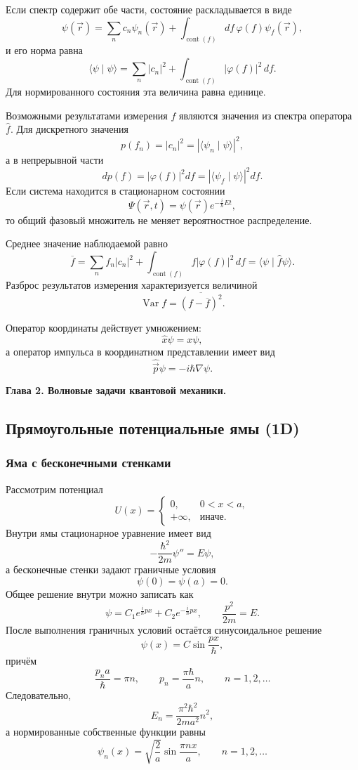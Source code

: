\documentclass[12pt,a4paper]{article}
\begin{document}
Если спектр содержит обе части, состояние раскладывается в виде
\[
    \psi(\vec r)=\sum_n c_n\psi_n(\vec r)
    +\int_{\operatorname{cont}(f)}df\,\varphi(f)\psi_f(\vec r),
\]
и его норма равна
\[
    \langle\psi\mid\psi\rangle
    =\sum_n|c_n|^2
    +\int_{\operatorname{cont}(f)}|\varphi(f)|^2\,df.
\]
Для нормированного состояния эта величина равна единице.

Возможными результатами измерения $f$ являются значения из спектра
оператора $\hat f$. Для дискретного значения
\[
    p(f_n)=|c_n|^2=|\langle\psi_n\mid\psi\rangle|^2,
\]
а в непрерывной части
\[
    dp(f)=|\varphi(f)|^2df
    =|\langle\psi_f\mid\psi\rangle|^2df.
\]
Если система находится в стационарном состоянии
\[
    \Psi(\vec r,t)=\psi(\vec r)e^{-\frac{i}{\hbar}Et},
\]
то общий фазовый множитель не меняет вероятностное распределение.

Среднее значение наблюдаемой равно
\[
    \overline f
    =\sum_n f_n|c_n|^2
    +\int_{\operatorname{cont}(f)}f|\varphi(f)|^2\,df
    =\boxed{\langle\psi\mid\hat f\psi\rangle}.
\]
Разброс результатов измерения характеризуется величиной
\[
    \operatorname{Var}f
    =\overline{(f-\overline f)^2}.
\]

Оператор координаты действует умножением:
\[
    \hat x\psi=x\psi,
\]
а оператор импульса в координатном представлении имеет вид
\[
    \hat{\vec p}\psi=-i\hbar\nabla\psi.
\]

\medskip
\noindent\textbf{Глава 2. Волновые задачи квантовой механики.}

\subsection{Прямоугольные потенциальные ямы (1D)}

\subsubsection{Яма с бесконечными стенками}

Рассмотрим потенциал
\[
    U(x)=
    \begin{cases}
        0, & 0<x<a,\\
        +\infty, & \text{иначе}.
    \end{cases}
\]
Внутри ямы стационарное уравнение имеет вид
\[
    -\frac{\hbar^2}{2m}\psi''=E\psi,
\]
а бесконечные стенки задают граничные условия
\[
    \psi(0)=\psi(a)=0.
\]
Общее решение внутри можно записать как
\[
    \psi=C_1e^{\frac{i}{\hbar}px}+C_2e^{-\frac{i}{\hbar}px},
    \qquad
    \frac{p^2}{2m}=E.
\]
После выполнения граничных условий остаётся синусоидальное решение
\[
    \psi(x)=C\sin\frac{px}{\hbar},
\]
причём
\[
    \frac{p_na}{\hbar}=\pi n,
    \qquad
    p_n=\frac{\pi\hbar}{a}n,
    \qquad n=1,2,\ldots
\]
Следовательно,
\[
    \boxed{E_n=\frac{\pi^2\hbar^2}{2ma^2}n^2},
\]
а нормированные собственные функции равны
\[
    \boxed{\psi_n(x)=\sqrt{\frac{2}{a}}\sin\frac{\pi nx}{a}},
    \qquad n=1,2,\ldots
\]
\end{document}
